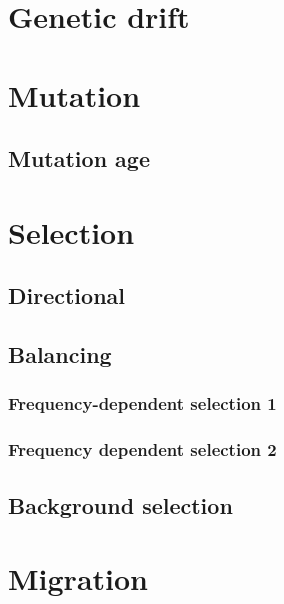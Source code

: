 \documentclass[
]{book}
\begin{document}
\hypertarget{genetic-drift}{%
\chapter{Genetic drift}\label{genetic-drift}}

\hypertarget{mutation}{%
\chapter{Mutation}\label{mutation}}

\hypertarget{mutation-age}{%
\section{Mutation age}\label{mutation-age}}

\hypertarget{selection-1}{%
\chapter{Selection}\label{selection-1}}

\hypertarget{directional}{%
\section{Directional}\label{directional}}

\hypertarget{balancing}{%
\section{Balancing}\label{balancing}}

\hypertarget{frequency-dependent-selection-1}{%
\subsection{Frequency-dependent selection 1}\label{frequency-dependent-selection-1}}

\hypertarget{frequency-dependent-selection-2}{%
\subsection{Frequency dependent selection 2}\label{frequency-dependent-selection-2}}

\hypertarget{background-selection}{%
\section{Background selection}\label{background-selection}}

\hypertarget{migration}{%
\chapter{Migration}\label{migration}}
\end{document}

